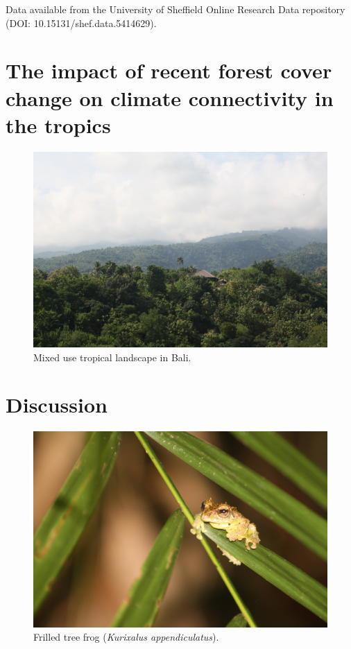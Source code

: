 \documentclass[12pt,a4paper,]{report}
\theoremstyle{definition}
\theoremstyle{definition}
\theoremstyle{definition}
\theoremstyle{remark}
\begin{document}
Data available from the University of Sheffield Online Research Data
repository (DOI: 10.15131/shef.data.5414629).

\chapter{The impact of recent forest cover change on climate
connectivity in the
tropics}\label{the-impact-of-recent-forest-cover-change-on-climate-connectivity-in-the-tropics}

\begin{figure}[!htb]
\centering
\includegraphics[width=15cm]{pics/landscape1.jpg}
\caption*{Mixed use tropical landscape in Bali.}
\end{figure}

\pagebreak

\chapter{Discussion}\label{discussion-2}

\begin{figure}[!htb]
\centering
\includegraphics[width=13cm]{pics/Frilled_tree_frog.jpg}
\caption*{Frilled tree frog (\textit{Kurixalus appendiculatus}).}
\end{figure}
\end{document}
